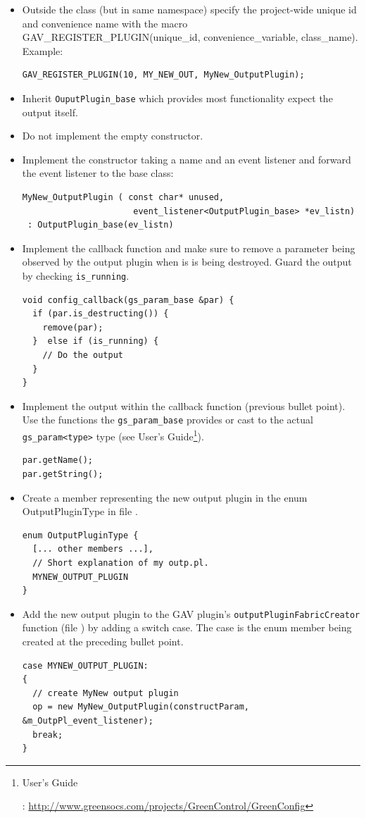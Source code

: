 \begin{itemize}
  \item Outside the class (but in same namespace) specify the project-wide unique id and convenience name with the macro {\sffamily GAV\_REGISTER\_PLUGIN(unique\_id, convenience\_variable, class\_name)}. \newline
     Example:
    \begin{lstlisting}
GAV_REGISTER_PLUGIN(10, MY_NEW_OUT, MyNew_OutputPlugin);
    \end{lstlisting}
  \item Inherit \lstinline|OuputPlugin_base| which provides most functionality expect the output itself.
  \item Do not implement the empty constructor.
  \item Implement the constructor taking a name and an event listener and forward the event listener to the base class:
    \begin{lstlisting}
MyNew_OutputPlugin ( const char* unused, 
                      event_listener<OutputPlugin_base> *ev_listn)
 : OutputPlugin_base(ev_listn)
    \end{lstlisting}
  \item Implement the callback function and make sure to remove a parameter being observed by the output plugin when is is being destroyed. Guard the output by checking \lstinline|is_running|.
    \begin{lstlisting}
void config_callback(gs_param_base &par) {
  if (par.is_destructing()) {
    remove(par);
  }  else if (is_running) {
    // Do the output
  }
}
    \end{lstlisting}
  \item Implement the output within the callback function (previous bullet point). Use the functions the \lstinline|gs_param_base| provides or cast to the actual \lstinline|gs_param<type>| type (see \GreenConfig User's Guide\footnote{\hypertarget{GCnfUsersGuide08target}{\GreenConfig User's Guide}: \url{http://www.greensocs.com/projects/GreenControl/GreenConfig}}).
    \begin{lstlisting}
par.getName();
par.getString(); 
    \end{lstlisting}
  \item Create a member representing the new output plugin in the enum {\sffamily OutputPluginType} in file .
    \begin{lstlisting}
enum OutputPluginType {
  [... other members ...],
  // Short explanation of my outp.pl.
  MYNEW_OUTPUT_PLUGIN
}
    \end{lstlisting}
  \item Add the new output plugin to the GAV plugin's \lstinline|outputPluginFabricCreator| function (file ) by adding a switch case. The case is the enum member being created at the preceding bullet point.
    \begin{lstlisting}
case MYNEW_OUTPUT_PLUGIN:
{
  // create MyNew output plugin
  op = new MyNew_OutputPlugin(constructParam, &m_OutpPl_event_listener);
  break;
}
    \end{lstlisting}


\end{itemize}

